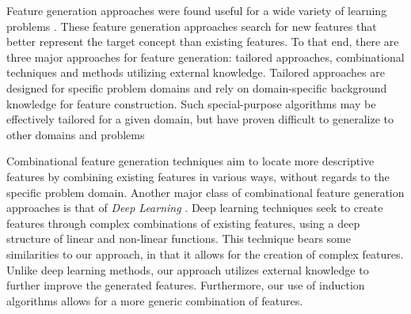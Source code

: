 \documentclass{article}
\theoremstyle{definition}
\begin{document}
Feature generation approaches were found useful for a wide variety of learning problems \citep{markovitch2002feature,ragavan1993complex}. %
These feature generation approaches search for new features that better represent the target concept than existing features. To that end, there are three major approaches for feature generation: tailored approaches, combinational techniques and methods utilizing external knowledge.
Tailored approaches \citep{hirsh1994bootstrapping} are designed for specific problem domains and rely on domain-specific background knowledge for feature construction. 
Such special-purpose algorithms may be effectively tailored for a given domain, but have proven difficult to generalize to other domains and problems

Combinational feature generation techniques aim to locate more descriptive features by combining existing features in various ways, without regards to the specific problem domain. %
Another major class of combinational feature generation approaches is that of \emph{Deep Learning} \citep{plotz2011featurefull,kim2013deepfull}. Deep learning techniques seek to create features through complex combinations of existing features, using a deep structure of linear and non-linear functions.
This technique bears some similarities to our approach, in that it allows for the creation of complex features. Unlike deep learning methods, our approach utilizes external knowledge to further improve the generated features. Furthermore, our use of induction algorithms allows for a more generic combination of features.
\end{document}
